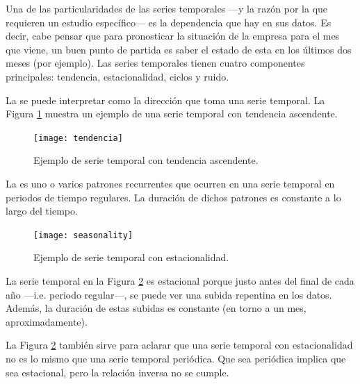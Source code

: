 Una de las particularidades de las series temporales ---y la razón por la que requieren un estudio específico--- es la dependencia que hay en sus datos. Es decir, cabe pensar que para pronosticar la situación de la empresa para el mes que viene, un buen punto de partida es saber el estado de esta en los últimos dos meses (por ejemplo). Las series temporales tienen cuatro componentes principales: tendencia, estacionalidad, ciclos y ruido.


La  \parencite{otext} se puede interpretar como la dirección que toma una serie temporal. La Figura  \ref{tend} muestra un ejemplo de una serie temporal con tendencia ascendente. 
\begin{figure}[H]
	\centering
	\texttt{[image: tendencia]}
	\caption{Ejemplo de serie temporal con tendencia ascendente.}
	\label{tend}
\end{figure}



La  es uno o varios patrones recurrentes que ocurren en una serie temporal en periodos de tiempo regulares. La duración de dichos patrones es constante a lo largo del tiempo. 
\begin{figure}[H]
	\centering
	\texttt{[image: seasonality]}
	\caption{Ejemplo de serie temporal con estacionalidad.}
	\label{estac}
\end{figure}
La serie temporal en la Figura \ref{estac} es estacional porque justo antes del final de cada año ---i.e. periodo regular---, se puede ver una subida repentina en los datos. Además, la duración de estas subidas es constante (en torno a un mes, aproximadamente).

La Figura \ref{estac} también sirve para aclarar que  una serie temporal con  estacionalidad no es lo mismo que una serie temporal periódica. Que sea periódica implica que sea estacional, pero la relación inversa no se cumple.


